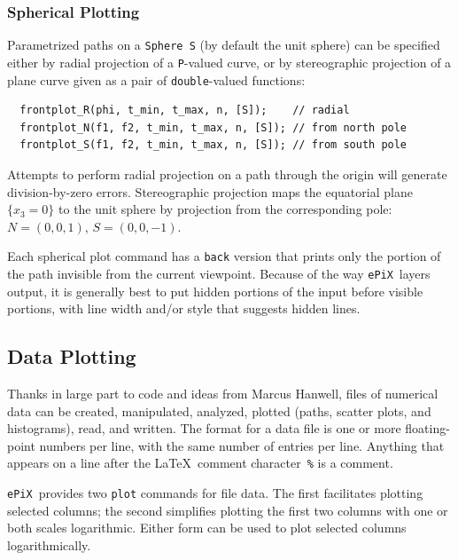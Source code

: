 \documentclass[12pt,letterpaper]{book}
\newcommand{\code}[1]{\texttt{#1}}
\newcommand{\ePiX}{\code{ePiX}}
\newcommand{\teximath}[1]{$#1$}
\newcommand{\findex}[1]{\ignorespaces}
\begin{document}
\subsubsection*{Spherical Plotting}

Parametrized paths on a \code{Sphere~S} (by default the unit sphere)
can be specified either by radial projection of a \code{P}-valued
curve, or by stereographic projection of a plane curve given as a pair
of \code{double}-valued functions:
\findex{frontplot\_R}
\findex{frontplot\_N}
\findex{frontplot\_S}
\findex{backplot\_R}
\findex{backplot\_N}
\findex{backplot\_S}
\begin{verbatim}
  frontplot_R(phi, t_min, t_max, n, [S]);    // radial
  frontplot_N(f1, f2, t_min, t_max, n, [S]); // from north pole
  frontplot_S(f1, f2, t_min, t_max, n, [S]); // from south pole
\end{verbatim}
Attempts to perform radial projection on a path through the origin
will generate division-by-zero errors. Stereographic projection maps
the equatorial plane \teximath{\{x_3=0\}} to the unit sphere by
projection from the corresponding pole: \teximath{N=(0,0,1)},
\teximath{S=(0,0,-1)}.

Each spherical plot command has a \code{back} version that prints only
the portion of the path invisible from the current viewpoint.
Because of the way \ePiX\ layers output, it is generally best to put
hidden portions of the input before visible portions, with line width
and/or style that suggests hidden lines.


\subsection{Data Plotting} 

Thanks in large part to code and ideas from Marcus Hanwell, files of
numerical data can be created, manipulated, analyzed, plotted (paths,
scatter plots, and histograms), read, and written.  The format for a
data file is one or more floating-point numbers per line, with the
same number of entries per line. Anything that appears on a line after
the \LaTeX\ comment character~\code{\%} is a comment.

\ePiX\ provides two \code{plot} commands for file data. The first
facilitates plotting selected columns; the second simplifies plotting
the first two columns with one or both scales logarithmic. Either form
can be used to plot selected columns logarithmically.
\end{document}
